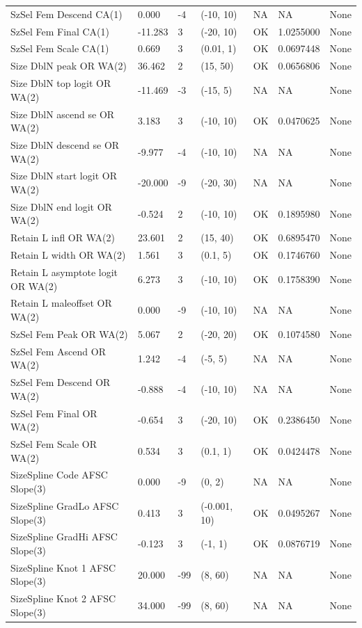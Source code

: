 \documentclass[11pt,
  english,
  a4paper,
]{article}
\begin{document}
\begin{landscape}
\begin{longtable}[t]{>{\raggedright\arraybackslash}p{7cm}lllll>{\raggedright\arraybackslash}p{4cm}}
SzSel Fem Descend CA(1) & 0.000 & -4 & (-10, 10) & NA & NA & None\\
SzSel Fem Final CA(1) & -11.283 & 3 & (-20, 10) & OK & 1.0255000 & None\\
SzSel Fem Scale CA(1) & 0.669 & 3 & (0.01, 1) & OK & 0.0697448 & None\\
Size DblN peak OR WA(2) & 36.462 & 2 & (15, 50) & OK & 0.0656806 & None\\
Size DblN top logit OR WA(2) & -11.469 & -3 & (-15, 5) & NA & NA & None\\
Size DblN ascend se OR WA(2) & 3.183 & 3 & (-10, 10) & OK & 0.0470625 & None\\
Size DblN descend se OR WA(2) & -9.977 & -4 & (-10, 10) & NA & NA & None\\
Size DblN start logit OR WA(2) & -20.000 & -9 & (-20, 30) & NA & NA & None\\
Size DblN end logit OR WA(2) & -0.524 & 2 & (-10, 10) & OK & 0.1895980 & None\\
Retain L infl OR WA(2) & 23.601 & 2 & (15, 40) & OK & 0.6895470 & None\\
Retain L width OR WA(2) & 1.561 & 3 & (0.1, 5) & OK & 0.1746760 & None\\
Retain L asymptote logit OR WA(2) & 6.273 & 3 & (-10, 10) & OK & 0.1758390 & None\\
Retain L maleoffset OR WA(2) & 0.000 & -9 & (-10, 10) & NA & NA & None\\
SzSel Fem Peak OR WA(2) & 5.067 & 2 & (-20, 20) & OK & 0.1074580 & None\\
SzSel Fem Ascend OR WA(2) & 1.242 & -4 & (-5, 5) & NA & NA & None\\
SzSel Fem Descend OR WA(2) & -0.888 & -4 & (-10, 10) & NA & NA & None\\
SzSel Fem Final OR WA(2) & -0.654 & 3 & (-20, 10) & OK & 0.2386450 & None\\
SzSel Fem Scale OR WA(2) & 0.534 & 3 & (0.1, 1) & OK & 0.0424478 & None\\
SizeSpline Code AFSC Slope(3) & 0.000 & -9 & (0, 2) & NA & NA & None\\
SizeSpline GradLo AFSC Slope(3) & 0.413 & 3 & (-0.001, 10) & OK & 0.0495267 & None\\
SizeSpline GradHi AFSC Slope(3) & -0.123 & 3 & (-1, 1) & OK & 0.0876719 & None\\
SizeSpline Knot 1 AFSC Slope(3) & 20.000 & -99 & (8, 60) & NA & NA & None\\
SizeSpline Knot 2 AFSC Slope(3) & 34.000 & -99 & (8, 60) & NA & NA & None\\

\end{longtable}
\end{landscape}
\end{document}
